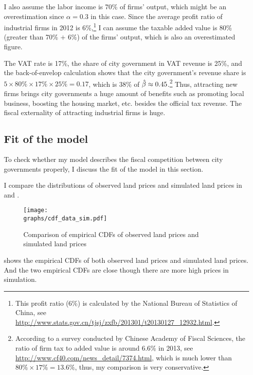 I also assume the labor income is 70\% of firms' output,
which might be an overestimation since $\alpha = 0.3$ in this case.
Since the average profit ratio of industrial firms in 2012 is 6\%,\footnote{
    This profit ratio (6\%) is calculated by the National Bureau of Statistics of China, see
    \url{http://www.stats.gov.cn/tjsj/zxfb/201301/t20130127_12932.html}.}
I can assume the taxable added value is 80\% (greater than 70\% $+$ 6\%) of the firms' output,
which is also an overestimated figure.

The VAT rate is 17\%,
the share of city government in VAT revenue is 25\%, and the back-of-envelop
calculation shows that the city government's revenue share is
$5 \times 80\% \times 17\% \times 25\% = 0.17$, which is 38\% of
$\hat{\beta} \approx 0.45$.\footnote{
    According to a survey conducted by Chinese Academy of Fiscal Sciences,
    the ratio of firm tax to added value is around 6.6\% in 2013,
    see \url{http://www.cf40.com/news_detail/7374.html}, which is much lower than
    $80\% \times 17\% = 13.6\%$, thus, my comparison is very conservative.
}
Thus, attracting new firms brings city governments a huge amount of
benefits such as promoting local business,
boosting the housing market, etc. besides the official tax revenue. The fiscal externality of attracting industrial firms is huge.


\subsection{Fit of the model}
To check whether my model describes the fiscal competition between city governments
properly,
I discuss the fit of the model in this section.

I compare the distributions of observed land prices and simulated land prices
in  and .

\begin{figure}[H]
    \centering
    \caption{Comparison of empirical CDFs of observed land prices and simulated land prices}
    \texttt{[image: \\graphs/cdf\_data\_sim.pdf]}
    \label{fig: cdf_fit}
\end{figure}
 shows the empirical CDFs of both observed land prices and simulated land prices.
And the two empirical CDFs are close though there are more high prices in simulation.

